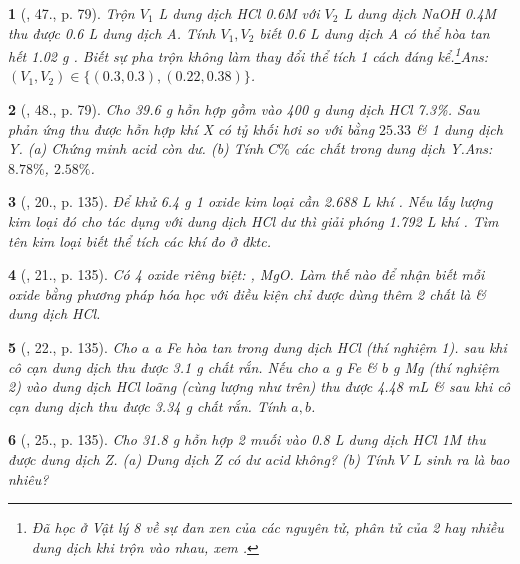 \documentclass{article}
\newtheorem{baitoan}{}
\begin{document}
\begin{baitoan}[\cite{An_Hoa_Hoc_nang_cao_8_9}, 47., p. 79]
	Trộn $V_1$ {\rm L} dung dịch {\rm HCl 0.6M} với $V_2$ {\rm L} dung dịch {\rm NaOH 0.4M} thu được {\rm0.6 L} dung dịch A. Tính $V_1,V_2$ biết {\rm0.6 L} dung dịch A có thể hòa tan hết {\rm1.02 g }. Biết sự pha trộn không làm thay đổi thể tích 1 cách đáng kể.\footnote{Đã học ở Vật lý 8 về sự đan xen của các nguyên tử, phân tử của 2 hay nhiều dung dịch khi trộn vào nhau, xem \cite[\S19, pp. 68--70]{SGK_Vat_Ly_8}.}\hfill{\sf Ans: $(V_1,V_2)\in\{(0.3,0.3),(0.22,0.38)\}$.}
\end{baitoan}

\begin{baitoan}[\cite{An_Hoa_Hoc_nang_cao_8_9}, 48., p. 79]
	Cho {\rm39.6 g} hỗn hợp gồm {\rm{}} vào {\rm400 g} dung dịch {\rm HCl 7.3\%}. Sau phản ứng thu được hỗn hợp khí X có tỷ khối hơi so với {\rm{}} bằng $25.33$ \& 1 dung dịch Y. (a) Chứng minh acid còn dư. (b) Tính $C\%$ các chất trong dung dịch Y.\hfill{\sf Ans: $8.78\%$, $2.58\%$.}
\end{baitoan}

\begin{baitoan}[\cite{An_Hoa_Hoc_nang_cao_8_9}, 20., p. 135]
	Để khử {\rm6.4 g} 1 oxide kim loại cần {\rm2.688 L} khí {\rm{}}. Nếu lấy lượng kim loại đó cho tác dụng với dung dịch {\rm HCl} dư thì giải phóng {\rm1.792 L} khí {\rm{}}. Tìm tên kim loại biết thể tích các khí đo ở đktc.
\end{baitoan}

\begin{baitoan}[\cite{An_Hoa_Hoc_nang_cao_8_9}, 21., p. 135]
	Có 4 oxide riêng biệt: {\rm{}, MgO}. Làm thế nào để nhận biết mỗi oxide bằng phương pháp hóa học với điều kiện chỉ được dùng thêm 2 chất là {\rm{}} \& dung dịch {\rm HCl}.
\end{baitoan}

\begin{baitoan}[\cite{An_Hoa_Hoc_nang_cao_8_9}, 22., p. 135]
	Cho $a$ {\rm a Fe} hòa tan trong dung dịch {\rm HCl} (thí nghiệm 1). sau khi cô cạn dung dịch thu được {\rm3.1 g} chất rắn. Nếu cho $a$ {\rm g Fe} \& $b$ {\rm g Mg} (thí nghiệm 2) vào dung dịch {\rm HCl} loãng (cùng lượng như trên) thu được {\rm4.48 mL } \& sau khi cô cạn dung dịch thu được {\rm3.34 g} chất rắn. Tính $a,b$.
\end{baitoan}

\begin{baitoan}[\cite{An_Hoa_Hoc_nang_cao_8_9}, 25., p. 135]
	Cho {\rm31.8 g} hỗn hợp 2 muối {\rm{}} vào {\rm0.8 L} dung dịch {\rm HCl 1M} thu được dung dịch Z. (a) Dung dịch Z có dư acid không? (b) Tính $V$ {\rm L } sinh ra là bao nhiêu?
\end{baitoan}
\end{document}
